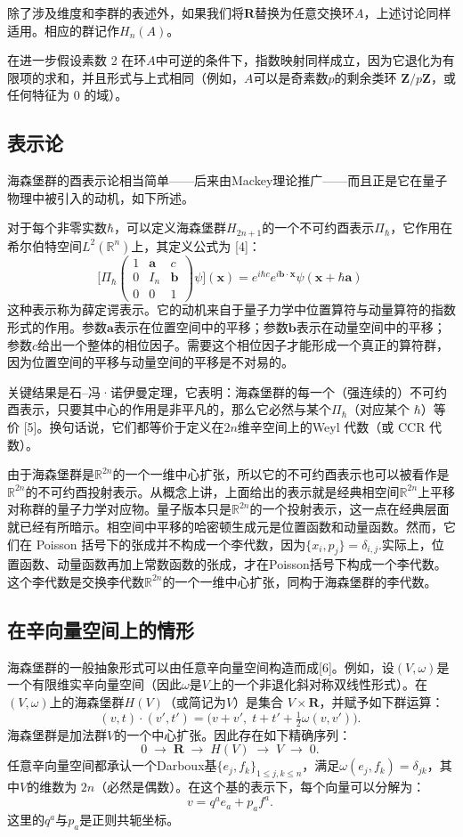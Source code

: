 除了涉及维度和李群的表述外，如果我们将$\mathbf{R}$替换为任意交换环$A$，上述讨论同样适用。相应的群记作$H_{n}(A)$。

在进一步假设素数 2 在环$A$中可逆的条件下，指数映射同样成立，因为它退化为有限项的求和，并且形式与上式相同（例如，$A$可以是奇素数$p$的剩余类环 $\mathbf{Z}/p\mathbf{Z}$，或任何特征为 0 的域）。
\subsection{表示论}
海森堡群的酉表示论相当简单——后来由Mackey理论推广——而且正是它在量子物理中被引入的动机，如下所述。

对于每个非零实数$\hbar$，可以定义海森堡群$H_{2n+1}$的一个不可约酉表示$\Pi_{\hbar}$，它作用在希尔伯特空间$L^{2}(\mathbb{R}^{n})$上，其定义公式为 [4]：
$$
\bigg[\Pi_{\hbar}
\begin{pmatrix}
1 & \mathbf{a} & c \\
0 & I_{n} & \mathbf{b} \\
0 & 0 & 1
\end{pmatrix}
\psi \bigg](\mathbf{x})
=
e^{i\hbar c} e^{i \mathbf{b}\cdot \mathbf{x}} \psi(\mathbf{x} + \hbar \mathbf{a})~
$$
这种表示称为薛定谔表示。它的动机来自于量子力学中位置算符与动量算符的指数形式的作用。参数$\mathbf{a}$表示在位置空间中的平移；参数$\mathbf{b}$表示在动量空间中的平移；参数$c$给出一个整体的相位因子。需要这个相位因子才能形成一个真正的算符群，因为位置空间的平移与动量空间的平移是不对易的。

关键结果是石–冯·诺伊曼定理，它表明：海森堡群的每一个（强连续的）不可约酉表示，只要其中心的作用是非平凡的，那么它必然与某个$\Pi_{\hbar}$（对应某个 $\hbar$）等价 [5]。换句话说，它们都等价于定义在$2n$维辛空间上的Weyl 代数（或 CCR 代数）。

由于海森堡群是$\mathbb{R}^{2n}$的一个一维中心扩张，所以它的不可约酉表示也可以被看作是$\mathbb{R}^{2n}$的不可约酉投射表示。从概念上讲，上面给出的表示就是经典相空间$\mathbb{R}^{2n}$上平移对称群的量子力学对应物。量子版本只是$\mathbb{R}^{2n}$的一个投射表示，这一点在经典层面就已经有所暗示。相空间中平移的哈密顿生成元是位置函数和动量函数。然而，它们在 Poisson 括号下的张成并不构成一个李代数，因为$\{x_{i}, p_{j}\} = \delta_{i,j}$.实际上，位置函数、动量函数再加上常数函数的张成，才在Poisson括号下构成一个李代数。这个李代数是交换李代数$\mathbb{R}^{2n}$的一个一维中心扩张，同构于海森堡群的李代数。
\subsection{在辛向量空间上的情形}
海森堡群的一般抽象形式可以由任意辛向量空间构造而成[6]。例如，设$(V, \omega)$是一个有限维实辛向量空间（因此$\omega$是$V$上的一个非退化斜对称双线性形式）。在$(V, \omega)$上的海森堡群$H(V)$（或简记为$V$）是集合 $V \times \mathbf{R}$，并赋予如下群运算：
$$
(v, t) \cdot (v', t') = \big(v + v', \; t + t' + \tfrac{1}{2}\omega(v, v')\big).~
$$
海森堡群是加法群$V$的一个中心扩张。因此存在如下精确序列：
$$
0 \;\longrightarrow\; \mathbf{R} \;\longrightarrow\; H(V) \;\longrightarrow\; V \;\longrightarrow\; 0.~
$$
任意辛向量空间都承认一个Darboux基$\{e_{j}, f_{k}\}_{1 \le j,k \le n}$，满足$\omega(e_{j}, f_{k}) = \delta_{jk}$，其中$V$的维数为 $2n$（必然是偶数）。在这个基的表示下，每个向量可以分解为：
$$
v = q^{a} e_{a} + p_{a} f^{a}.~
$$
这里的$q^{a}$与$p_{a}$是正则共轭坐标。

